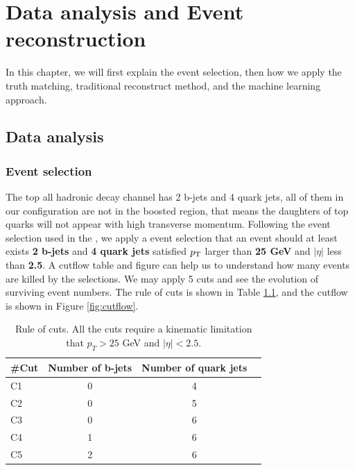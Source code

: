 \chapter{Data analysis and Event reconstruction}\label{section:Reconstruction}

In this chapter, we will first explain the event selection, then how we apply the truth matching, traditional reconstruct method, and the machine learning approach.

\section{Data analysis}\label{sec:Data analysis}

\subsection{Event selection}\label{subsec:Event selection}
The top all hadronic decay channel has 2 b-jets and 4 quark jets, all of them in our configuration are not in the boosted region, that means the daughters of top quarks will not appear with high transverse momentum. Following the event selection used in the \cite{Mccarthy:2015ucy},  we apply a event selection that an event should at least exists \textbf{2 b-jets} and \textbf{4 quark jets} satisfied $p_{\rm T}$ larger than \textbf{25 GeV} and $|\eta|$ less than \textbf{2.5}. A cutflow table and figure can help us to understand how many events are killed by the selections. We may apply 5 cuts and see the evolution of surviving event numbers. The rule of cuts is shown in Table \ref{table:cuts}, and the cutflow is shown in Figure \ref{fig:cutflow}.
\\
\begin{center}
	\begin{table}[h]
		\begin{tabular}{p{} c c c }
			\cline{1-3}
			\#Cut    & Number of b-jets & Number of quark jets  \\
			\hline
			C1      &   0  & 4    \\
			C2      &   0  & 5    \\
			C3      &   0  & 6    \\
			C4      &   1  & 6    \\
			C5      &   2  & 6    \\
			\hline
		\end{tabular}
		\caption{Rule of cuts. All the cuts require a kinematic limitation that $p_{T} > 25$ GeV and $|\eta|<2.5$.}
		\label{table:cuts}
	\end{table}
\end{center}
